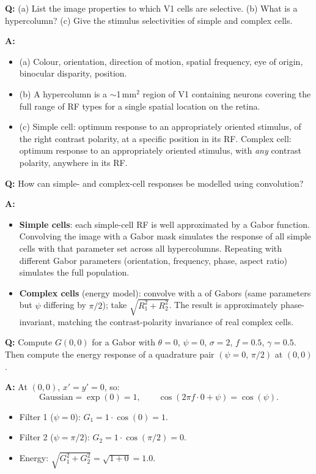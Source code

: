 \begin{exbox}
\textbf{Q:} (a) List the image properties to which V1 cells are selective. (b) What is a hypercolumn? (c) Give the stimulus selectivities of simple and complex cells.

\textbf{A:}
\begin{itemize}
  \item (a) Colour, orientation, direction of motion, spatial frequency, eye of origin, binocular disparity, position.
  \item (b) A hypercolumn is a $\sim$1\,mm$^2$ region of V1 containing neurons covering the full range of RF types for a single spatial location on the retina.
  \item (c) Simple cell: optimum response to an appropriately oriented stimulus, of the right contrast polarity, at a specific position in its RF. Complex cell: optimum response to an appropriately oriented stimulus, with \emph{any} contrast polarity, anywhere in its RF.
\end{itemize}
\end{exbox}

\begin{exbox}
\textbf{Q:} How can simple- and complex-cell responses be modelled using convolution?

\textbf{A:}
\begin{itemize}
  \item \textbf{Simple cells}: each simple-cell RF is well approximated by a Gabor function. Convolving the image with a Gabor mask simulates the response of all simple cells with that parameter set across all hypercolumns. Repeating with different Gabor parameters (orientation, frequency, phase, aspect ratio) simulates the full population.
  \item \textbf{Complex cells} (energy model): convolve with a  of Gabors (same parameters but $\psi$ differing by $\pi/2$); take $\sqrt{R_1^2 + R_2^2}$. The result is approximately phase-invariant, matching the contrast-polarity invariance of real complex cells.
\end{itemize}
\end{exbox}

\begin{exbox}
\textbf{Q:} Compute $G(0,0)$ for a Gabor with $\theta=0$, $\psi=0$, $\sigma=2$, $f=0.5$, $\gamma=0.5$. Then compute the energy response of a quadrature pair $(\psi=0,\,\pi/2)$ at $(0,0)$.

\textbf{A:} At $(0,0)$, $x'=y'=0$, so:
\[
\text{Gaussian} = \exp(0) = 1, \qquad \cos(2\pi f \cdot 0 + \psi) = \cos(\psi).
\]
\begin{itemize}
  \item Filter 1 ($\psi=0$): $G_1 = 1\cdot \cos(0) = 1$.
  \item Filter 2 ($\psi=\pi/2$): $G_2 = 1\cdot \cos(\pi/2) = 0$.
  \item Energy: $\sqrt{G_1^2 + G_2^2} = \sqrt{1 + 0} = 1.0$.
\end{itemize}
\end{exbox}

